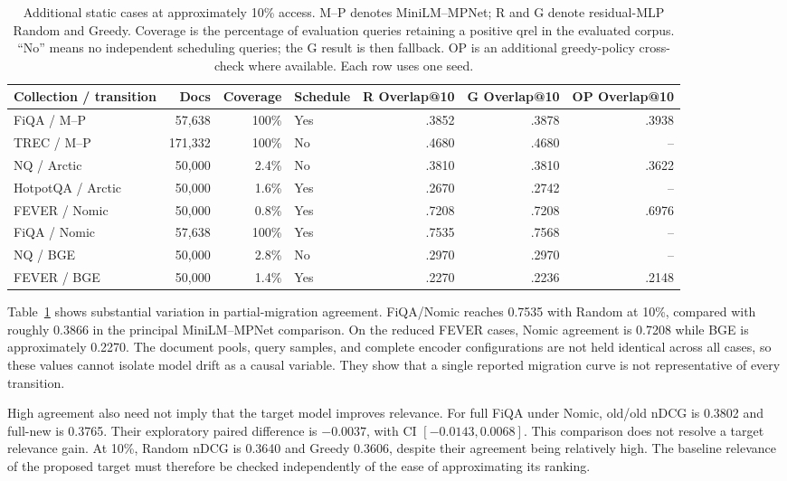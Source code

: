 \documentclass[runningheads]{llncs}
\begin{document}
\begin{table}[t]
\caption{Additional static cases at approximately 10\% access. M--P denotes MiniLM--MPNet; R and G denote residual-MLP Random and Greedy. Coverage is the percentage of evaluation queries retaining a positive qrel in the evaluated corpus. ``No'' means no independent scheduling queries; the G result is then fallback. OP is an additional greedy-policy cross-check where available. Each row uses one seed.}
\label{tab:cases}
\centering
\small
\setlength{\tabcolsep}{3pt}
\begin{tabular}{@{}lrrlrrr@{}}
\toprule
Collection / transition & Docs & Coverage & Schedule & R Overlap@10 & G Overlap@10 & OP Overlap@10 \\
\midrule
FiQA / M--P & 57,638 & 100\% & Yes & .3852 & .3878 & .3938 \\
TREC / M--P & 171,332 & 100\% & No & .4680 & .4680 & -- \\
NQ / Arctic & 50,000 & 2.4\% & No & .3810 & .3810 & .3622 \\
HotpotQA / Arctic & 50,000 & 1.6\% & Yes & .2670 & .2742 & -- \\
FEVER / Nomic & 50,000 & 0.8\% & Yes & .7208 & .7208 & .6976 \\
FiQA / Nomic & 57,638 & 100\% & Yes & .7535 & .7568 & -- \\
NQ / BGE & 50,000 & 2.8\% & No & .2970 & .2970 & -- \\
FEVER / BGE & 50,000 & 1.4\% & Yes & .2270 & .2236 & .2148 \\
\bottomrule
\end{tabular}
\end{table}

Table~\ref{tab:cases} shows substantial variation in partial-migration agreement. FiQA/Nomic reaches 0.7535 with Random at 10\%, compared with roughly 0.3866 in the principal MiniLM--MPNet comparison. On the reduced FEVER cases, Nomic agreement is 0.7208 while BGE is approximately 0.2270. The document pools, query samples, and complete encoder configurations are not held identical across all cases, so these values cannot isolate model drift as a causal variable. They show that a single reported migration curve is not representative of every transition.

High agreement also need not imply that the target model improves relevance. For full FiQA under Nomic, old/old nDCG is 0.3802 and full-new is 0.3765. Their exploratory paired difference is $-0.0037$, with CI $[-0.0143,0.0068]$. This comparison does not resolve a target relevance gain. At 10\%, Random nDCG is 0.3640 and Greedy 0.3606, despite their agreement being relatively high. The baseline relevance of the proposed target must therefore be checked independently of the ease of approximating its ranking.
\end{document}
